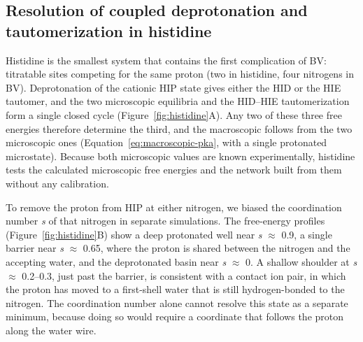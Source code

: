 \subsection{Resolution of coupled deprotonation and tautomerization in histidine}

Histidine is the smallest system that contains the first complication of BV: titratable sites competing for the same proton (two in histidine, four nitrogens in BV).
Deprotonation of the cationic HIP state gives either the HID or the HIE tautomer, and the two microscopic equilibria and the HID--HIE tautomerization form a single closed cycle (Figure~\ref{fig:histidine}A).
Any two of these three free energies therefore determine the third, and the macroscopic \pka{} follows from the two microscopic ones (Equation~\ref{eq:macroscopic-pka}, with a single protonated microstate).
Because both microscopic \pka{} values are known experimentally,\cite{kyte_structure_2006} histidine tests the calculated microscopic free energies and the network built from them without any calibration.

To remove the proton from HIP at either nitrogen, we biased the coordination number \emph{s} of that nitrogen in separate simulations.
The free-energy profiles (Figure~\ref{fig:histidine}B) show a deep protonated well near \emph{s} $\approx$ 0.9, a single barrier near \emph{s} $\approx$ 0.65, where the proton is shared between the nitrogen and the accepting water, and the deprotonated basin near \emph{s} $\approx$ 0.
A shallow shoulder at \emph{s} $\approx$ 0.2--0.3, just past the barrier, is consistent with a contact ion pair, in which the proton has moved to a first-shell water that is still hydrogen-bonded to the nitrogen.
The coordination number alone cannot resolve this state as a separate minimum, because doing so would require a coordinate that follows the proton along the water wire.

